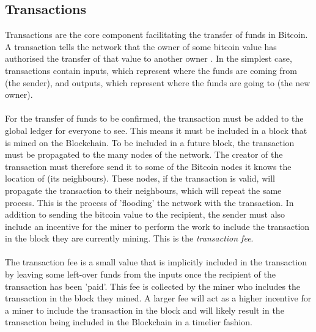 \subsection{Transactions}\label{background-transactions}
Transactions are the core component facilitating the transfer of funds in Bitcoin. A transaction tells the network that the owner of some bitcoin value has authorised the transfer of that value to another owner \cite{RefWorks:doc:5c39e80ae4b0854ae611b047}. In the simplest case, transactions contain inputs, which represent where the funds are coming from (the sender), and outputs, which represent where the funds are going to (the new owner). 
\\\\
For the transfer of funds to be confirmed, the transaction must be added to the global ledger for everyone to see. This means it must be included in a block that is mined on the Blockchain. To be included in a future block, the transaction must be propagated to the many nodes of the network. The creator of the transaction must therefore send it to some of the Bitcoin nodes it knows the location of (its neighbours). These nodes, if the transaction is valid, will propagate the transaction to their neighbours, which will repeat the same process. This is the process of 'flooding' the network with the transaction. In addition to sending the bitcoin value to the recipient, the sender must also include an incentive for the miner to perform the work to include the transaction in the block they are currently mining. This is the \textit{transaction fee}.
\\\\
The transaction fee is a small value that is implicitly included in the transaction by leaving some left-over funds from the inputs once the recipient of the transaction has been 'paid'. This fee is collected by the miner who includes the transaction in the block they mined. A larger fee will act as a higher incentive for a miner to include the transaction in the block and will likely result in the transaction being included in the Blockchain in a timelier fashion.  

